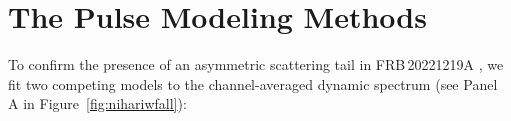 \documentclass[twocolumn, linenumbers, tra]{aastex631}
\newcommand{\nihari}{FRB\,20221219A } %
\begin{document}
{%


\section{The Pulse Modeling Methods}\label{apB}

To confirm the presence of an asymmetric scattering tail in \nihari, we fit two competing models to the channel-averaged dynamic spectrum (see Panel A in Figure\ \ref{fig:nihariwfall}): 

}
\end{document}
